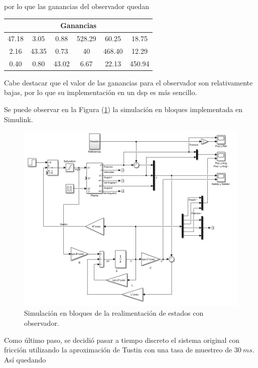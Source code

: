 por lo que las ganancias del observador quedan

\begin{table}[H]
\centering
\begin{tabular}{@{}cccccc@{}}
\toprule
\multicolumn{6}{c}{Ganancias}                    \\ \midrule
47.18 & 3.05  & 0.88  & 528.29 & 60.25  & 18.75  \\
2.16  & 43.35 & 0.73  & 40     & 468.40 & 12.29  \\
0.40  & 0.80  & 43.02 & 6.67   & 22.13  & 450.94 \\ \bottomrule
\end{tabular}
\end{table}
Cabe destacar que el valor de las ganancias para el observador son relativamente bajas, por lo que su implementación en un dsp es más sencillo.

Se puede observar en la Figura (\ref{fig:obsv}) la simulación en bloques implementada en Simulink.

\begin{figure}[H]
	\centering
	\includegraphics[width=\linewidth]{../Modelo de Control/ImagenesModelo de Control/obsv.png}
	\caption{Simulación en bloques de la realimentación de estados con observador.}	
	\label{fig:obsv}
\end{figure}


Como último paso, se decidió pasar a tiempo discreto el sistema original con fricción utilizando la aproximación de Tustin con una tasa de muestreo de $30 \ ms$. Así quedando

